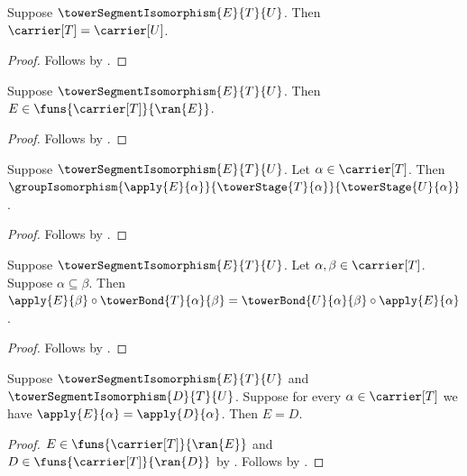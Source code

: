 \begin{proposition}\label{tower_segment_isomorphism_carrier}
    Suppose $\towerSegmentIsomorphism{E}{T}{U}$.
    Then $\carrier[T]=\carrier[U]$.
\end{proposition}
\begin{proof}
    Follows by .
\end{proof}

\begin{proposition}\label{tower_segment_isomorphism_family_type}
    Suppose $\towerSegmentIsomorphism{E}{T}{U}$.
    Then $E\in\funs{\carrier[T]}{\ran{E}}$.
\end{proposition}
\begin{proof}
    Follows by .
\end{proof}

\begin{proposition}\label{tower_segment_isomorphism_component}
    Suppose $\towerSegmentIsomorphism{E}{T}{U}$.
    Let $\alpha\in\carrier[T]$.
    Then $\groupIsomorphism{\apply{E}{\alpha}}
        {\towerStage{T}{\alpha}}{\towerStage{U}{\alpha}}$.
\end{proposition}
\begin{proof}
    Follows by .
\end{proof}

\begin{proposition}\label{tower_segment_isomorphism_square}
    Suppose $\towerSegmentIsomorphism{E}{T}{U}$.
    Let $\alpha,\beta\in\carrier[T]$.
    Suppose $\alpha\subseteq\beta$.
    Then $\apply{E}{\beta}\circ\towerBond{T}{\alpha}{\beta}=
        \towerBond{U}{\alpha}{\beta}\circ\apply{E}{\alpha}$.
\end{proposition}
\begin{proof}
    Follows by .
\end{proof}

\begin{theorem}\label{tower_segment_isomorphism_extensionality}
    Suppose $\towerSegmentIsomorphism{E}{T}{U}$ and
        $\towerSegmentIsomorphism{D}{T}{U}$.
    Suppose for every $\alpha\in\carrier[T]$ we have
        $\apply{E}{\alpha}=\apply{D}{\alpha}$.
    Then $E=D$.
\end{theorem}
\begin{proof}
    $E\in\funs{\carrier[T]}{\ran{E}}$ and
        $D\in\funs{\carrier[T]}{\ran{D}}$ by
        .
    Follows by .
\end{proof}

